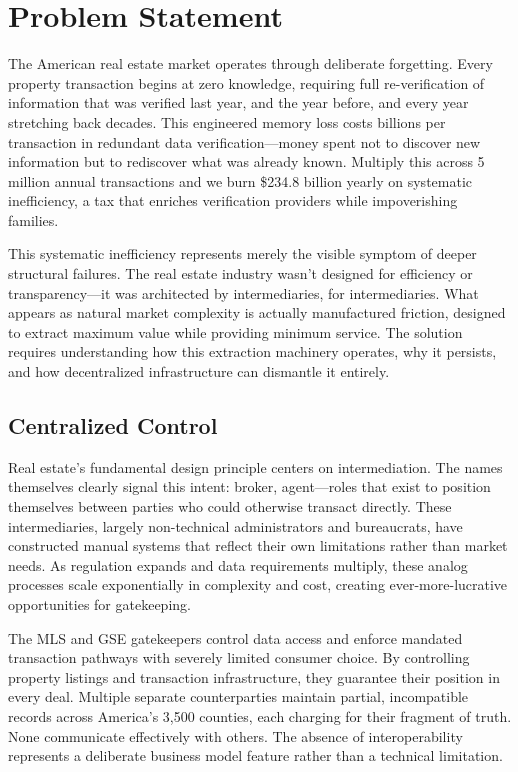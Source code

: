 \chapter{Problem Statement}

The American real estate market operates through deliberate forgetting. Every property transaction begins at zero knowledge, requiring full re-verification of information that was verified last year, and the year before, and every year stretching back decades. This engineered memory loss costs billions per transaction in redundant data verification---money spent not to discover new information but to rediscover what was already known. Multiply this across 5 million annual transactions and we burn \$234.8 billion yearly on systematic inefficiency, a tax that enriches verification providers while impoverishing families.

This systematic inefficiency represents merely the visible symptom of deeper structural failures. The real estate industry wasn't designed for efficiency or transparency---it was architected by intermediaries, for intermediaries. What appears as natural market complexity is actually manufactured friction, designed to extract maximum value while providing minimum service. The solution requires understanding how this extraction machinery operates, why it persists, and how decentralized infrastructure can dismantle it entirely.

\section{Centralized Control}

Real estate's fundamental design principle centers on intermediation. The names themselves clearly signal this intent: broker, agent---roles that exist to position themselves between parties who could otherwise transact directly. These intermediaries, largely non-technical administrators and bureaucrats, have constructed manual systems that reflect their own limitations rather than market needs. As regulation expands and data requirements multiply, these analog processes scale exponentially in complexity and cost, creating ever-more-lucrative opportunities for gatekeeping.

The MLS and GSE gatekeepers control data access and enforce mandated transaction pathways with severely limited consumer choice. By controlling property listings and transaction infrastructure, they guarantee their position in every deal. Multiple separate counterparties maintain partial, incompatible records across America's 3,500 counties, each charging for their fragment of truth. None communicate effectively with others. The absence of interoperability represents a deliberate business model feature rather than a technical limitation.


